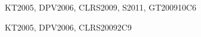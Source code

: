 \begin{syllabus}
\begin{unit}{\ALFundamentalDataStructuresandAlgorithms}{}{KT2005, DPV2006, CLRS2009, S2011, GT2009}{10}{C6}
\begin{learningoutcomes}
    \item \ALFundamentalDataStructuresandAlgorithmsLODiscuss [\Usage] %
    \item \ALFundamentalDataStructuresandAlgorithmsLODiscussFactors [\Familiarity] %
    \item \ALFundamentalDataStructuresandAlgorithmsLOSolveProblems [\Assessment] %
    \item \ALFundamentalDataStructuresandAlgorithmsLODemonstrate [\Assessment] %
    \item \ALFundamentalDataStructuresandAlgorithmsLODescribeTheAnd [\Assessment] %
    \item \ALFundamentalDataStructuresandAlgorithmsLOSolveProblemsAlgorithms [\Assessment] %
\end{learningoutcomes}
\end{unit}

\begin{unit}{\ALBasicAutomataComputabilityandComplexity}{}{KT2005, DPV2006, CLRS2009}{2}{C9}
\begin{topics}%
    \item \ALBasicAutomataComputabilityandComplexityTopicIntroduction %
    \item \ALBasicAutomataComputabilityandComplexityTopicIntroductionTo %
\end{topics}
\begin{learningoutcomes}
    \item \ALBasicAutomataComputabilityandComplexityLODefine [\Familiarity] %
    \item \ALBasicAutomataComputabilityandComplexityLOExplainTheNp [\Familiarity] %
\end{learningoutcomes}
\end{unit}


\end{syllabus}
